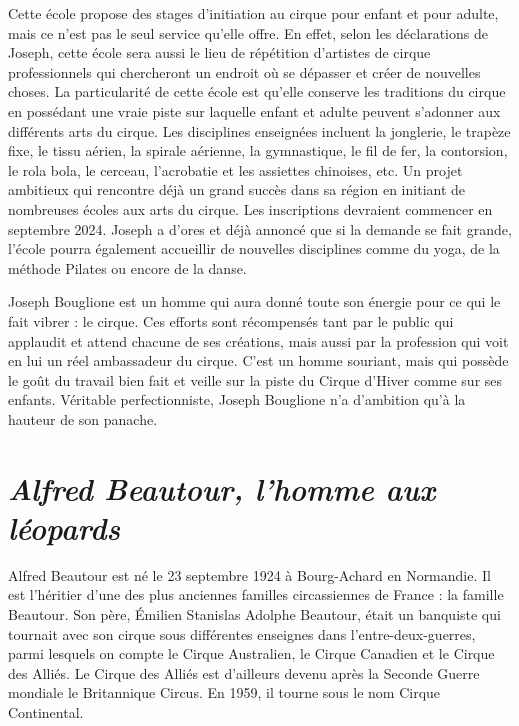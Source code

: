 Cette école propose des stages d’initiation au cirque pour enfant et pour adulte, mais ce n’est pas le seul service qu’elle offre. En effet, selon les déclarations de Joseph, cette école sera aussi le lieu de répétition d’artistes de cirque professionnels qui chercheront un endroit où se dépasser et créer de nouvelles choses. La particularité de cette école est qu’elle conserve les traditions du cirque en possédant une vraie piste sur laquelle enfant et adulte peuvent s’adonner aux différents arts du cirque. Les disciplines enseignées incluent la jonglerie, le trapèze fixe, le tissu aérien, la spirale aérienne, la gymnastique, le fil de fer, la contorsion, le rola bola, le cerceau, l’acrobatie et les assiettes chinoises, etc. Un projet ambitieux qui rencontre déjà un grand succès dans sa région en initiant de nombreuses écoles aux arts du cirque. Les inscriptions devraient commencer en septembre 2024. Joseph a d’ores et déjà annoncé que si la demande se fait grande, l’école pourra également accueillir de nouvelles disciplines comme du yoga, de la méthode Pilates ou encore de la danse.

Joseph Bouglione est un homme qui aura donné toute son énergie pour ce qui le fait vibrer : le cirque. Ces efforts sont récompensés tant par le public qui applaudit et attend chacune de ses créations, mais aussi par la profession qui voit en lui un réel ambassadeur du cirque. C'est un homme souriant, mais qui possède le goût du travail bien fait et veille sur la piste du Cirque d’Hiver comme sur ses enfants. Véritable perfectionniste, Joseph Bouglione n’a d’ambition qu’à la hauteur de son panache.

\section*{\textit{Alfred Beautour, l’homme aux léopards}}
{}

Alfred Beautour est né le 23 septembre 1924 à Bourg-Achard en Normandie. Il est l’héritier d’une des plus anciennes familles circassiennes de France : la famille Beautour. Son père, Émilien Stanislas Adolphe Beautour, était un banquiste qui tournait avec son cirque sous différentes enseignes dans l’entre-deux-guerres, parmi lesquels on compte le Cirque Australien, le Cirque Canadien et le Cirque des Alliés. Le Cirque des Alliés est d’ailleurs devenu après la Seconde Guerre mondiale le Britannique Circus. En 1959, il tourne sous le nom Cirque Continental.


